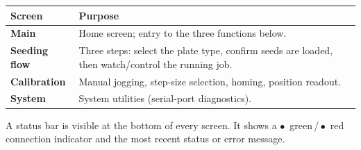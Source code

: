 \begin{center}
\begin{tabularx}{\textwidth}{@{}lX@{}}
  \toprule
  \textbf{Screen} & \textbf{Purpose} \\
  \midrule
  \textbf{Main} & Home screen; entry to the three functions below. \\
  \textbf{Seeding flow} & Three steps: select the plate type, confirm seeds are
    loaded, then watch/control the running job. \\
  \textbf{Calibration} & Manual jogging, step-size selection, homing, position readout. \\
  \textbf{System} & System utilities (serial-port diagnostics). \\
  \bottomrule
\end{tabularx}
\end{center}

A status bar is visible at the bottom of every screen. It shows a
\textcolor{accent}{$\bullet$}~green\,/\,\textcolor{warncol}{$\bullet$}~red connection
indicator and the most recent status or error message.
